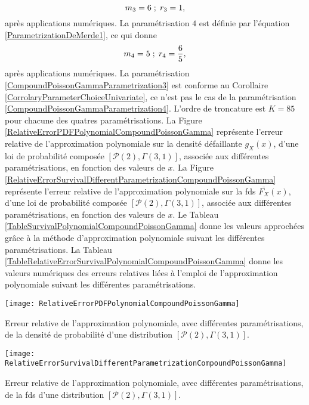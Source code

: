 \begin{equation}\label{CompoundPoissonGammaParametrization3}
m_{3}=6\hspace{0.1cm};\hspace{0.1cm}r_{3}=1,
\end{equation}
après applications numériques. La paramétrisation $4$ est définie par l\rq{}équation \eqref{ParametrizationDeMerde1}, ce qui donne 
\begin{equation}\label{CompoundPoissonGammaParametrization4}
m_{4}=5\hspace{0.1cm};\hspace{0.1cm}r_{4}=\frac{6}{5},
\end{equation}
après applications numériques. La paramétrisation \eqref{CompoundPoissonGammaParametrization3} est conforme au Corollaire \ref{CorrolaryParameterChoiceUnivariate}, ce n\rq{}est pas le cas de la paramétrisation \eqref{CompoundPoissonGammaParametrization4}. L\rq{}ordre de troncature est $K=85$ pour chacune des quatres paramétrisations. La Figure \ref{RelativeErrorPDFPolynomialCompoundPoissonGamma} représente l\rq{}erreur relative de l\rq{}approximation polynomiale sur la densité défaillante $g_{X}(x)$, d\rq{}une loi de probabilité composée $\left[\mathcal{P}(2),\Gamma(3,1)\right]$, associée aux différentes paramétrisations, en fonction des valeurs de $x$. La Figure \ref{RelativeErrorSurvivalDifferentParametrizationCompoundPoissonGamma} représente l\rq{}erreur relative de l\rq{}approximation polynomiale sur la \gls{fds} $\overline{F_{X}}(x)$, d\rq{}une loi de probabilité composée $\left[\mathcal{P}(2),\Gamma(3,1)\right]$, associée aux différentes paramétrisations, en fonction des valeurs de $x$. Le Tableau \ref{TableSurvivalPolynomialCompoundPoissonGamma} donne les valeurs approchées grâce à la méthode d\rq{}approximation polynomiale suivant les différentes paramétrisations. La Tableau \ref{TableRelativeErrorSurvivalPolynomialCompoundPoissonGamma} donne les valeurs numériques des erreurs relatives liées à l\rq{}emploi de l\rq{}approximation polynomiale suivant les différentes paramétrisations.\\
\begin{figureth}			
\texttt{[image: RelativeErrorPDFPolynomialCompoundPoissonGamma]}
\caption{Erreur relative de l'approximation polynomiale, avec différentes paramétrisations, de la densité de probabilité d'une distribution $\left[\mathcal{P}(2),\Gamma(3,1)\right]$.}		
\label{RelativeErrorPDFPolynomialCompoundPoissonGamma}
\end{figureth}
\begin{figureth}			
\texttt{[image: RelativeErrorSurvivalDifferentParametrizationCompoundPoissonGamma]}
\caption{Erreur relative de l'approximation polynomiale, avec différentes paramétrisations, de la \gls{fds} d'une distribution $\left[\mathcal{P}(2),\Gamma(3,1)\right]$.}		
\label{RelativeErrorSurvivalDifferentParametrizationCompoundPoissonGamma}
	\end{figureth}

